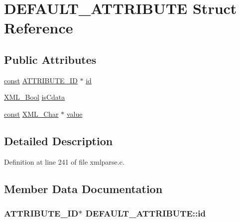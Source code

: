 \hypertarget{struct_d_e_f_a_u_l_t___a_t_t_r_i_b_u_t_e}{}\section{D\+E\+F\+A\+U\+L\+T\+\_\+\+A\+T\+T\+R\+I\+B\+U\+TE Struct Reference}
\label{struct_d_e_f_a_u_l_t___a_t_t_r_i_b_u_t_e}
\subsection*{Public Attributes}
\begin{DoxyCompactItemize}
\item 
\hyperlink{getopt1_8c_a2c212835823e3c54a8ab6d95c652660e}{const} \hyperlink{xmlparse_8c_ab0dc92cf6eadf5e62d25ee83cf2605f4}{A\+T\+T\+R\+I\+B\+U\+T\+E\+\_\+\+ID} $\ast$ \hyperlink{struct_d_e_f_a_u_l_t___a_t_t_r_i_b_u_t_e_a7369e913b955d694ee3afebbd9ac132c}{id}
\item 
\hyperlink{amiga_2include_2libraries_2expat_8h_a5fe41bca8b7a23b2405f1b967e70f33a}{X\+M\+L\+\_\+\+Bool} \hyperlink{struct_d_e_f_a_u_l_t___a_t_t_r_i_b_u_t_e_a6bf4768c04349f72a4ffdeccb6493871}{is\+Cdata}
\item 
\hyperlink{getopt1_8c_a2c212835823e3c54a8ab6d95c652660e}{const} \hyperlink{amiga_2include_2libraries_2expat_8h_a63da96463e775e1ec3a7d1f076208127}{X\+M\+L\+\_\+\+Char} $\ast$ \hyperlink{struct_d_e_f_a_u_l_t___a_t_t_r_i_b_u_t_e_ad1eba06bb12c82948f2aa78ceeb2e485}{value}
\end{DoxyCompactItemize}


\subsection{Detailed Description}


Definition at line 241 of file xmlparse.\+c.



\subsection{Member Data Documentation}
\subsubsection[{\texorpdfstring{id}{id}}]{ {\bf A\+T\+T\+R\+I\+B\+U\+T\+E\+\_\+\+ID}$\ast$ D\+E\+F\+A\+U\+L\+T\+\_\+\+A\+T\+T\+R\+I\+B\+U\+T\+E\+::id}\hypertarget{struct_d_e_f_a_u_l_t___a_t_t_r_i_b_u_t_e_a7369e913b955d694ee3afebbd9ac132c}{}\label{struct_d_e_f_a_u_l_t___a_t_t_r_i_b_u_t_e_a7369e913b955d694ee3afebbd9ac132c}



